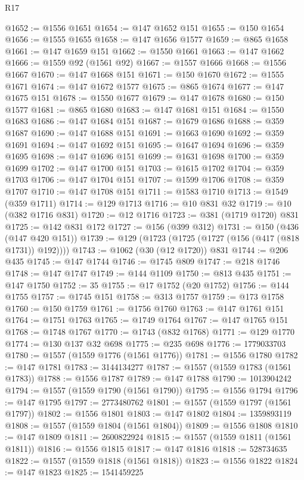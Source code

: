 \begin{lexlean}{R17}
\begin{coremodule}
@1652 := @1556 @1651
@1654 := @147 @1652 @151
@1655 := @150 @1654
@1656 := @1555 @1655
@1658 := @147 @1656 @1577
@1659 := @865 @1658
@1661 := @147 @1659 @151
@1662 := @1550 @1661
@1663 := @147 @1662
@1666 := @1559 @92 (@1561 @92)
@1667 := @1557 @1666
@1668 := @1556 @1667
@1670 := @147 @1668 @151
@1671 := @150 @1670
@1672 := @1555 @1671
@1674 := @147 @1672 @1577
@1675 := @865 @1674
@1677 := @147 @1675 @151
@1678 := @1550 @1677
@1679 := @147 @1678
@1680 := @150 @1577
@1681 := @865 @1680
@1683 := @147 @1681 @151
@1684 := @1550 @1683
@1686 := @147 @1684 @151
@1687 := @1679 @1686
@1688 := @359 @1687
@1690 := @147 @1688 @151
@1691 := @1663 @1690
@1692 := @359 @1691
@1694 := @147 @1692 @151
@1695 := @1647 @1694
@1696 := @359 @1695
@1698 := @147 @1696 @151
@1699 := @1631 @1698
@1700 := @359 @1699
@1702 := @147 @1700 @151
@1703 := @1615 @1702
@1704 := @359 @1703
@1706 := @147 @1704 @151
@1707 := @1599 @1706
@1708 := @359 @1707
@1710 := @147 @1708 @151
@1711 := @1583 @1710
@1713 := @1549 (@359 @1711)
@1714 := @129 @1713
@1716 := @10 @831 @32
@1719 := @10 (@382 @1716 @831)
@1720 := @12 @1716
@1723 := @381 (@1719 @1720) @831
@1725 := @142 @831 @172
@1727 := @156 (@399 @312)
@1731 := @150 (@436 (@147 @420 @151))
@1739 := @129 (@1723 (@1725 (@1727 (@156 (@417 (@818 @1731)) @192))))
@1743 := @1062 (@30 (@12 @1720)) @831
@1744 := @206 @435
@1745 := @147 @1744
@1746 := @1745 @809
@1747 := @218 @1746
@1748 := @147 @1747
@1749 := @144 @1109
@1750 := @813 @435
@1751 := @147 @1750
@1752 := 35
@1755 := @17 @1752 (@20 @1752)
@1756 := @144 @1755
@1757 := @1745 @151
@1758 := @313 @1757
@1759 := @173 @1758
@1760 := @150 @1759
@1761 := @1756 @1760
@1763 := @147 @1761 @151
@1764 := @1751 @1763
@1765 := @1749 @1764
@1767 := @147 @1765 @151
@1768 := @1748 @1767
@1770 := @1743 (@832 @1768)
@1771 := @129 @1770
@1774 := @130 @137 @32 @698
@1775 := @235 @698
@1776 := 1779033703
@1780 := @1557 (@1559 @1776 (@1561 @1776))
@1781 := @1556 @1780
@1782 := @147 @1781
@1783 := 3144134277
@1787 := @1557 (@1559 @1783 (@1561 @1783))
@1788 := @1556 @1787
@1789 := @147 @1788
@1790 := 1013904242
@1794 := @1557 (@1559 @1790 (@1561 @1790))
@1795 := @1556 @1794
@1796 := @147 @1795
@1797 := 2773480762
@1801 := @1557 (@1559 @1797 (@1561 @1797))
@1802 := @1556 @1801
@1803 := @147 @1802
@1804 := 1359893119
@1808 := @1557 (@1559 @1804 (@1561 @1804))
@1809 := @1556 @1808
@1810 := @147 @1809
@1811 := 2600822924
@1815 := @1557 (@1559 @1811 (@1561 @1811))
@1816 := @1556 @1815
@1817 := @147 @1816
@1818 := 528734635
@1822 := @1557 (@1559 @1818 (@1561 @1818))
@1823 := @1556 @1822
@1824 := @147 @1823
@1825 := 1541459225

\end{coremodule}
\end{lexlean}
